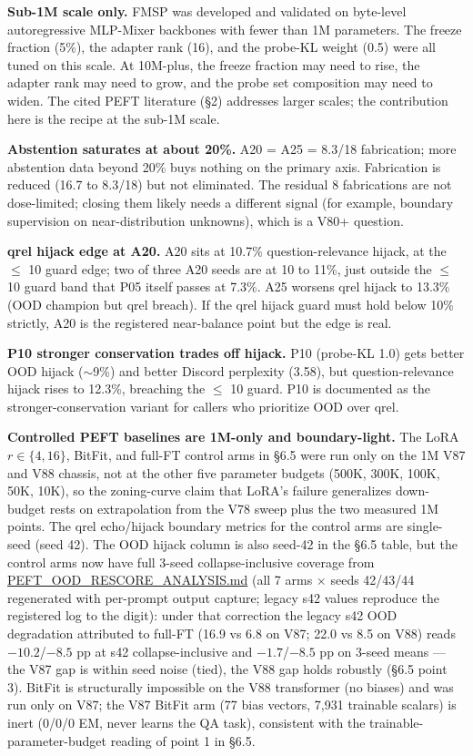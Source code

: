 \documentclass[11pt]{article}
\begin{document}
\textbf{Sub-1M scale only.} FMSP was developed and validated on byte-level autoregressive MLP-Mixer backbones with fewer than 1M parameters. The freeze fraction (5\%), the adapter rank (16), and the probe-KL weight (0.5) were all tuned on this scale. At 10M-plus, the freeze fraction may need to rise, the adapter rank may need to grow, and the probe set composition may need to widen. The cited PEFT literature (\S2) addresses larger scales; the contribution here is the recipe at the sub-1M scale.

\textbf{Abstention saturates at about 20\%.} A20 = A25 = 8.3/18 fabrication; more abstention data beyond 20\% buys nothing on the primary axis. Fabrication is reduced (16.7 to 8.3/18) but not eliminated. The residual 8 fabrications are not dose-limited; closing them likely needs a different signal (for example, boundary supervision on near-distribution unknowns), which is a V80+ question.

\textbf{qrel hijack edge at A20.} A20 sits at 10.7\% question-relevance hijack, at the $\leq$ 10 guard edge; two of three A20 seeds are at 10 to 11\%, just outside the $\leq$ 10 guard band that P05 itself passes at 7.3\%. A25 worsens qrel hijack to 13.3\% (OOD champion but qrel breach). If the qrel hijack guard must hold below 10\% strictly, A20 is the registered near-balance point but the edge is real.

\textbf{P10 stronger conservation trades off hijack.} P10 (probe-KL 1.0) gets better OOD hijack ($\sim$9\%) and better Discord perplexity (3.58), but question-relevance hijack rises to 12.3\%, breaching the $\leq$ 10 guard. P10 is documented as the stronger-conservation variant for callers who prioritize OOD over qrel.

\textbf{Controlled PEFT baselines are 1M-only and boundary-light.} The LoRA $r \in \{4,16\}$, BitFit, and full-FT control arms in \S6.5 were run only on the 1M V87 and V88 chassis, not at the other five parameter budgets (500K, 300K, 100K, 50K, 10K), so the zoning-curve claim that LoRA's failure generalizes down-budget rests on extrapolation from the V78 sweep plus the two measured 1M points. The qrel echo/hijack boundary metrics for the control arms are single-seed (seed 42). The OOD hijack column is also seed-42 in the \S6.5 table, but the control arms now have full 3-seed collapse-inclusive coverage from \href{https://github.com/llaa33219/MicroMixer-4/blob/4bb630413dfa58ef3141291e121ab8c006d03235/PEFT_OOD_RESCORE_ANALYSIS.md}{PEFT\_OOD\_RESCORE\_ANALYSIS.md} (all 7 arms $\times$ seeds 42/43/44 regenerated with per-prompt output capture; legacy s42 values reproduce the registered log to the digit): under that correction the legacy s42 OOD degradation attributed to full-FT (16.9 vs 6.8 on V87; 22.0 vs 8.5 on V88) reads $-10.2$/$-8.5$ pp at s42 collapse-inclusive and $-1.7$/$-8.5$ pp on 3-seed means --- the V87 gap is within seed noise (tied), the V88 gap holds robustly (\S6.5 point 3). BitFit is structurally impossible on the V88 transformer (no biases) and was run only on V87; the V87 BitFit arm (77 bias vectors, 7{,}931 trainable scalars) is inert (0/0/0 EM, never learns the QA task), consistent with the trainable-parameter-budget reading of point 1 in \S6.5.
\end{document}
